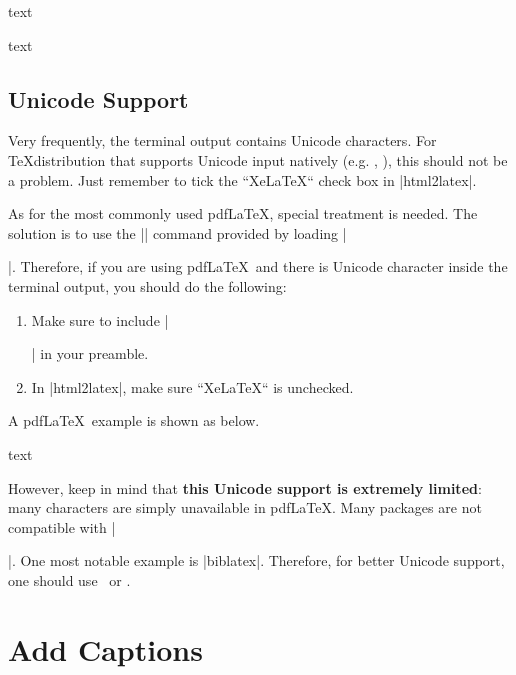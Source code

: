 \documentclass[letterpaper, 11pt, DIV=11]{scrartcl}
\begin{document}
\begin{tcbsrccode}{text}

\end{tcbsrccode}



\begin{tcbsrccode}{text}

\end{tcbsrccode}


\subsection{Unicode Support}

Very frequently, the terminal output contains Unicode characters. For \TeX distribution that supports Unicode input natively (e.g. \XeLaTeX, \LuaLaTeX), this should not be a problem. Just remember to tick the ``XeLaTeX`` check box in \rawinline|html2latex|.


As for the most commonly used pdf\LaTeX, special treatment is needed. The solution is to use the \texinline|\unichar| command provided by loading \texinline|\usepackage[utf8x]{inputenc}|. Therefore, if you are using pdf\LaTeX\ and there is Unicode character inside the terminal output, you should do the following:

\begin{enumerate}
\item Make sure to include \texinline|\usepackage[utf8x]{inputenc}| in your preamble.
\item In \rawinline|html2latex|, make sure ``XeLaTeX`` is unchecked.
\end{enumerate}

A pdf\LaTeX\ example is shown as below. 

\begin{tcbsrccode}{text}

\end{tcbsrccode}


However, keep in mind that \textbf{this Unicode support is extremely limited}: many characters are simply unavailable in pdf\LaTeX. Many packages are not compatible with \texinline|\usepackage[utf8x]{inputenc}|. One most notable example is \rawinline|biblatex|. Therefore, for better Unicode support, one should use \XeLaTeX\ or \LuaLaTeX.

\section{Add Captions}
\end{document}
